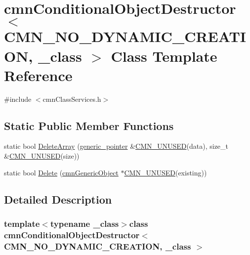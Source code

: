 \hypertarget{classcmn_conditional_object_destructor_3_01_c_m_n___n_o___d_y_n_a_m_i_c___c_r_e_a_t_i_o_n_00_01__class_01_4}{\section{cmn\-Conditional\-Object\-Destructor$<$ C\-M\-N\-\_\-\-N\-O\-\_\-\-D\-Y\-N\-A\-M\-I\-C\-\_\-\-C\-R\-E\-A\-T\-I\-O\-N, \-\_\-class $>$ Class Template Reference}
\label{classcmn_conditional_object_destructor_3_01_c_m_n___n_o___d_y_n_a_m_i_c___c_r_e_a_t_i_o_n_00_01__class_01_4}
}


{\ttfamily \#include $<$cmn\-Class\-Services.\-h$>$}

\subsection*{Static Public Member Functions}
\begin{DoxyCompactItemize}
\item 
static bool \hyperlink{classcmn_conditional_object_destructor_3_01_c_m_n___n_o___d_y_n_a_m_i_c___c_r_e_a_t_i_o_n_00_01__class_01_4_a71b99b0b069f4a59f23c025ec9e196ff}{Delete\-Array} (\hyperlink{classcmn_generic_object}{generic\-\_\-pointer} \&\hyperlink{cmn_portability_8h_a021894e2626935fa2305434b1e893ff6}{C\-M\-N\-\_\-\-U\-N\-U\-S\-E\-D}(data), size\-\_\-t \&\hyperlink{cmn_portability_8h_a021894e2626935fa2305434b1e893ff6}{C\-M\-N\-\_\-\-U\-N\-U\-S\-E\-D}(size))
\item 
static bool \hyperlink{classcmn_conditional_object_destructor_3_01_c_m_n___n_o___d_y_n_a_m_i_c___c_r_e_a_t_i_o_n_00_01__class_01_4_a3343c85a6cefb48df2e3f2e5dd2dcab6}{Delete} (\hyperlink{classcmn_generic_object}{cmn\-Generic\-Object} $\ast$\hyperlink{cmn_portability_8h_a021894e2626935fa2305434b1e893ff6}{C\-M\-N\-\_\-\-U\-N\-U\-S\-E\-D}(existing))
\end{DoxyCompactItemize}


\subsection{Detailed Description}
\subsubsection*{template$<$typename \-\_\-class$>$class cmn\-Conditional\-Object\-Destructor$<$ C\-M\-N\-\_\-\-N\-O\-\_\-\-D\-Y\-N\-A\-M\-I\-C\-\_\-\-C\-R\-E\-A\-T\-I\-O\-N, \-\_\-class $>$}

